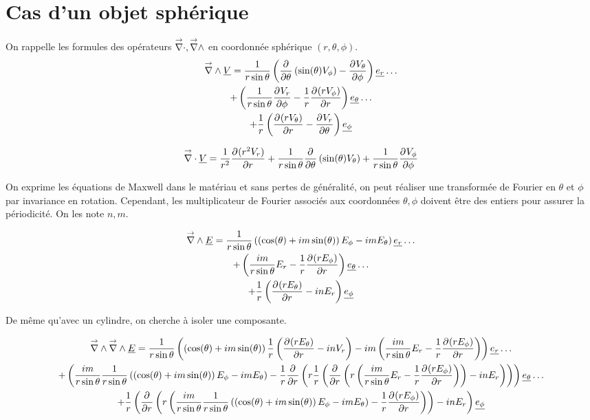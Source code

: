 \section{Cas d'un objet sphérique}


    On rappelle les formules des opérateurs $\vdiv, \vrot$ en coordonnée sphérique $(r,\theta,\phi)$.
    \begin{multline}
        \vrot \v{V} = \frac{1}{r\sin\theta}\left(\ddr{\theta}{}\left(\sin(\theta)V_\phi\right) - \ddr{\phi}{V_\theta}\right)\v{e_r}\dots 
        \\
        + \left(\frac{1}{r\sin\theta}\ddr{\phi}{V_r} - \frac{1}{r}\ddr{r}{(rV_\phi)} \right)\v{e_\theta} \dots
        \\
        + \frac{1}{r}\left(\ddr{r}{(rV_\theta)}-\ddr{\theta}{V_r}\right)\v{e_\phi}
    \end{multline}

    \begin{equation}
        \vdiv \v{V} = \frac{1}{r^2}\ddr{r}{(r^2V_r)}
        + \frac{1}{r\sin\theta}\ddr{\theta}{}\left(\sin(\theta)V_\theta\right) + \frac{1}{r\sin\theta}\ddr{\phi}{V_\phi}
    \end{equation}

    On exprime les équations de Maxwell dans le matériau et sans pertes de généralité, on peut réaliser une transformée de Fourier en $\theta$ et $\phi$ par invariance en rotation. Cependant, les multiplicateur de Fourier associés aux coordonnées $\theta,\phi$ doivent être des entiers pour assurer la périodicité. On les note $n,m$.

    \begin{multline}
        \vrot \v{E} = \frac{1}{r\sin\theta}\left(\left(\cos(\theta) + im\sin(\theta)\right)E_\phi - im E_\theta\right)\v{e_r}\dots 
        \\
        + \left(\frac{im}{r\sin\theta}E_r - \frac{1}{r}\ddr{r}{(rE_\phi)} \right)\v{e_\theta} \dots
        \\
        + \frac{1}{r}\left(\ddr{r}{(rE_\theta)}-inE_r\right)\v{e_\phi}
    \end{multline}

    De même qu'avec un cylindre, on cherche à isoler une composante.

    \begin{multline}
        \vrot \vrot \v{E} = \frac{1}{r\sin\theta}\left(\left(\cos(\theta) + im\sin(\theta)\right)\frac{1}{r}\left(\ddr{r}{(rE_\theta)}-inV_r\right) - im \left(\frac{im}{r\sin\theta}E_r - \frac{1}{r}\ddr{r}{(rE_\phi)} \right)\right)\v{e_r}\dots 
        \\
        + \left(\frac{im}{r\sin\theta}\frac{1}{r\sin\theta}\left(\left(\cos(\theta) + im\sin(\theta)\right)E_\phi - im E_\theta\right) - \frac{1}{r}\ddr{r}{}\left(r\frac{1}{r}\left(\ddr{r}{}\left(r\left(\frac{im}{r\sin\theta}E_r - \frac{1}{r}\ddr{r}{(rE_\phi)} \right)\right)-inE_r\right)\right) \right)\v{e_\theta} \dots
        \\
        + \frac{1}{r}\left(\ddr{r}{}\left(r\left(\frac{im}{r\sin\theta}\frac{1}{r\sin\theta}\left(\left(\cos(\theta) + im\sin(\theta)\right)E_\phi - im E_\theta\right) - \frac{1}{r}\ddr{r}{(rE_\phi)} \right)\right)-inE_r\right)\v{e_\phi}
    \end{multline}